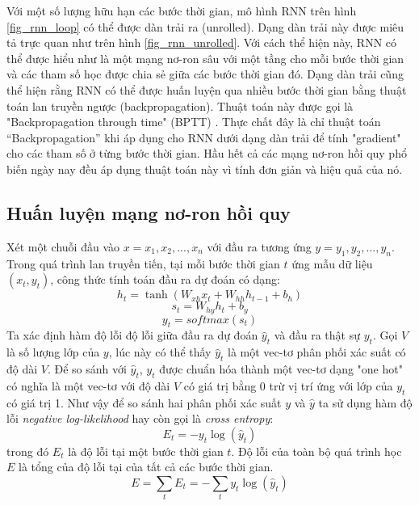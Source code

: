 Với một số lượng hữu hạn các bước thời gian, mô hình RNN trên hình \ref{fig_rnn_loop} có thể được dàn trải ra (unrolled). Dạng dàn trải này được miêu tả trực quan như trên hình \ref{fig_rnn_unrolled}. Với cách thể hiện này, RNN có thể được hiểu như là một mạng nơ-ron sâu với một tầng cho mỗi bước thời gian và các tham số học được chia sẻ giữa các bước thời gian đó. Dạng dàn trải cũng thể hiện rằng RNN có thể được huấn luyện qua nhiều bước thời gian bằng thuật toán lan truyền ngược (backpropagation). Thuật toán này được gọi là "Backpropagation through time" (BPTT) \cite{werbos1990}. Thực chất đây là chỉ thuật toán “Backpropagation” khi áp dụng cho RNN dưới dạng dàn trải để tính "gradient" cho các tham số ở từng bước thời gian. Hầu hết cả các mạng nơ-ron hồi quy phổ biến ngày nay đều áp dụng thuật toán này vì tính đơn giản và hiệu quả của nó.

\subsection{Huấn luyện mạng nơ-ron hồi quy}
Xét một chuỗi đầu vào $x={x_1,x_2,...,x_n}$ với đầu ra tương ứng $y={y_1,y_2,...,y_n}$. Trong quá trình lan truyền tiến, tại mỗi bước thời gian $t$ ứng mẫu dữ liệu $(x_t, y_t)$, công thức tính toán đầu ra dự đoán có dạng:
\begin{equation} \label{rnnForwardProp1}
	h_t = \tanh \left(W_{xh} x_t + W_{hh}h_{t-1} + b_h \right) 
\end{equation}
\begin{equation} \label{rnnForwardProp2}
	s_t = W_{hy} h_t + b_y 
\end{equation}
\begin{equation} \label{rnnForwardProp3}
	y_t = softmax (s_t) 
\end{equation}
Ta xác định hàm độ lỗi độ lỗi giữa đầu ra dự đoán $\hat{y}_t$ và đầu ra thật sự $y_t$. Gọi $V$ là số lượng lớp của $y$, lúc này có thể thấy $\hat{y}_t$ là một vec-tơ phân phối xác suất có độ dài $V$. Để so sánh với $\hat{y}_t$, $y_t$ được chuẩn hóa thành một vec-tơ dạng "one hot" có nghĩa là một vec-tơ với độ dài $V$ có giá trị bằng 0 trừ vị trí ứng với lớp của $y_t$ có giá trị 1. Như vậy để so sánh hai phân phối xác suất $y$ và $\hat{y}$ ta sử dụng hàm độ lỗi \textit{negative log-likelihood} hay còn gọi là \textit{cross entropy}:
\begin{equation} \label{errorOfAnExample}
	E_t = -y_t\log(\hat{y}_t)
\end{equation}
trong đó $E_t$ là độ lỗi tại một bước thời gian $t$. Độ lỗi của toàn bộ quá trình học $E$ là tổng của độ lỗi tại của tất cả các bước thời gian.
\begin{equation} \label{errorOfAll}
	E = \sum_{t}E_t = - \sum_{t}y_t\log(\hat{y}_t) 
\end{equation}

